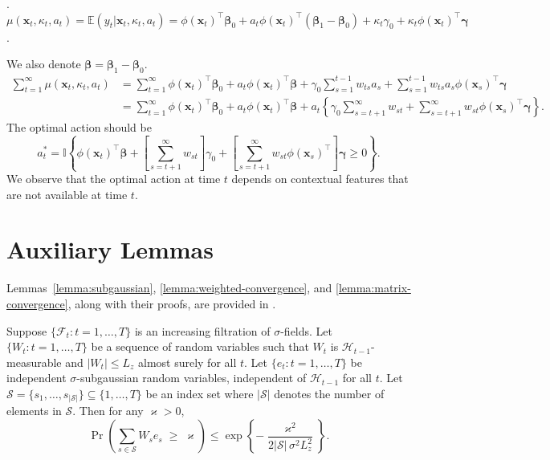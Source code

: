 \documentclass[12pt]{article}
\begin{document}
\medskip
{}. $\mu(\bm{x}_t, \kappa_t, a_t) = \mathbb{E}(y_t \vert \bm{x}_t, \kappa_t, a_t) = \phi(\bm{x}_t)^{\top}\bm{\beta}_0+a_t\phi(\bm{x}_t)^{\top}(\bm{\beta}_1-\bm{\beta}_0)+\kappa_t\gamma_0+\kappa_t \phi(\bm{x}_t)^{\top} \bm{\gamma}$.

\noindent
We also denote $\bm{\beta} = \bm{\beta}_1 - \bm{\beta}_0$.
\begin{align*}
    \sum_{t=1}^\infty \mu(\bm{x}_t,\kappa_t, a_t) 
    &= \sum_{t=1}^\infty \phi(\bm{x}_t)^{\top}\bm{\beta}_0+a_t\phi(\bm{x}_t)^{\top}\bm{\beta} + \gamma_0\sum_{s=1}^{t-1}w_{ts}a_s + \sum_{s=1}^{t-1}w_{ts}a_s \phi(\bm{x}_s)^{\top}\bm{\gamma} \\
    &= \sum_{t=1}^\infty \phi(\bm{x}_t)^{\top}\bm{\beta}_0+a_t\phi(\bm{x}_t)^{\top}\bm{\beta} + a_t\left\{\gamma_0\sum_{s=t+1}^\infty w_{st} + \sum_{s=t+1}^\infty w_{st}\phi(\bm{x}_s)^\top \bm{\gamma} \right\}.
\end{align*}
The optimal action should be
\begin{equation}
\label{equ:othermodel20}
    a_t^\ast = 
        \mathbb{I}\left\{\phi(\bm{x}_t)^{\top} \bm{\beta} + \left[\sum_{s=t+1}^\infty w_{st}\right] \gamma_0 + \left[\sum_{s=t+1}^\infty w_{st}\phi(\bm{x}_s)^\top\right] \bm{\gamma} \ge 0 \right\}.
\end{equation}
We observe that the optimal action at time $t$ depends on contextual features that are not available at time $t$. 




\section{Auxiliary Lemmas}
\label{app:lemmas}
Lemmas~\ref{lemma:subgaussian}, \ref{lemma:weighted-convergence}, and \ref{lemma:matrix-convergence}, along with their proofs, are provided in \cite{chen2021}.

\begin{lemma}
\label{lemma:subgaussian}
Suppose $\{\mathcal{F}_t : t = 1,\ldots,T\}$ is an increasing filtration of $\sigma$-fields.  
Let $\{W_t : t = 1,\ldots,T\}$ be a sequence of random variables such that $W_t$ is $\mathcal{H}_{t-1}$-measurable and $|W_t|\le L_z$ almost surely for all $t$.  
Let $\{e_t : t = 1,\ldots,T\}$ be independent $\sigma$-subgaussian random variables, independent of $\mathcal{H}_{t-1}$ for all $t$.  
Let $\mathcal{S}=\{s_1,\ldots,s_{|\mathcal{S}|}\}\subseteq \{1,\ldots,T\}$ be an index set where $|\mathcal{S}|$ denotes the number of elements in $\mathcal{S}$.  
Then for any $\varkappa>0$, $$\Pr\!\left(\sum_{s\in\mathcal{S}} W_s e_s \;\ge\; \varkappa \right) 
\le \exp\!\left\{-\frac{\varkappa^2}{2|\mathcal{S}|\,\sigma^2 L_z^2}\right\}.$$
\end{lemma}
\end{document}
